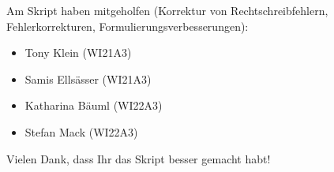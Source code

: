 Am Skript haben mitgeholfen
(Korrektur von Rechtschreibfehlern, Fehlerkorrekturen, Formulierungsverbesserungen):
\begin{itemize}
\item Tony Klein (WI21A3)
\item Samis Ellsässer (WI21A3)
\item Katharina Bäuml (WI22A3)
\item Stefan Mack (WI22A3)
\end{itemize}
Vielen Dank, dass Ihr das Skript besser gemacht habt!
